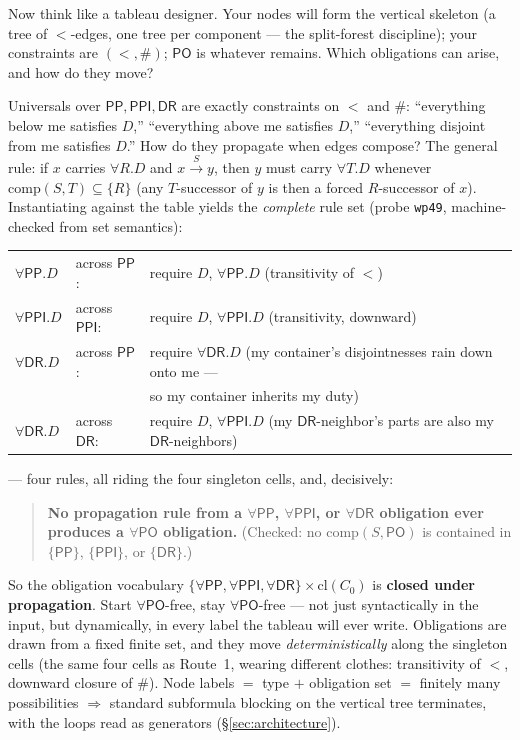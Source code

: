 \documentclass[11pt]{article}
\newcommand{\DR}{\ensuremath{\mathsf{DR}}}
\newcommand{\PO}{\ensuremath{\mathsf{PO}}}
\newcommand{\PP}{\ensuremath{\mathsf{PP}}}
\newcommand{\PPI}{\ensuremath{\mathsf{PPI}}}
\newcommand{\Comp}{\mathrm{comp}}
\newcommand{\cl}{\mathrm{cl}}
\newcommand{\code}[1]{\texttt{#1}}
\begin{document}
Now think like a tableau designer. Your nodes will form the vertical
skeleton (a tree of ${<}$-edges, one tree per component --- the
split-forest discipline); your constraints are $({<},{\#})$; $\PO$ is
whatever remains. Which obligations can arise, and how do they move?

Universals over $\PP,\PPI,\DR$ are exactly constraints on ${<}$ and
${\#}$: ``everything below me satisfies $D$,'' ``everything above me
satisfies $D$,'' ``everything disjoint from me satisfies $D$.'' How do
they propagate when edges compose? The general rule: if $x$ carries
$\forall R.D$ and $x\xrightarrow{\,S\,}y$, then $y$ must carry
$\forall T.D$ whenever $\Comp(S,T)\subseteq\{R\}$ (any $T$-successor of
$y$ is then a forced $R$-successor of $x$). Instantiating against the
table yields the \emph{complete} rule set (probe \code{wp49},
machine-checked from set semantics):

\begin{center}
\begin{tabular}{@{}lll@{}}
$\forall\PP.D$  & across $\PP$:  & require $D$, $\forall\PP.D$
  \quad(transitivity of ${<}$)\\
$\forall\PPI.D$ & across $\PPI$: & require $D$, $\forall\PPI.D$
  \quad(transitivity, downward)\\
$\forall\DR.D$  & across $\PP$:  & require $\forall\DR.D$
  \quad(my container's disjointnesses rain down onto me ---\\
  & & \phantom{require }so my container inherits my duty)\\
$\forall\DR.D$  & across $\DR$:  & require $D$, $\forall\PPI.D$
  \quad(my $\DR$-neighbor's parts are also my $\DR$-neighbors)
\end{tabular}
\end{center}

--- four rules, all riding the four singleton cells, and, decisively:

\begin{quote}
\textbf{No propagation rule from a $\forall\PP$, $\forall\PPI$, or
$\forall\DR$ obligation ever produces a $\forall\PO$ obligation.}
(Checked: no $\Comp(S,\PO)$ is contained in $\{\PP\}$, $\{\PPI\}$, or
$\{\DR\}$.)
\end{quote}

So the obligation vocabulary
$\{\forall\PP,\forall\PPI,\forall\DR\}\times\cl(C_0)$ is \textbf{closed
under propagation}. Start $\forall\PO$-free, stay $\forall\PO$-free ---
not just syntactically in the input, but dynamically, in every label
the tableau will ever write. Obligations are drawn from a fixed finite
set, and they move \emph{deterministically} along the singleton cells
(the same four cells as Route~1, wearing different clothes:
transitivity of ${<}$, downward closure of ${\#}$). Node labels $=$
type $+$ obligation set $=$ finitely many possibilities
$\Rightarrow$ standard subformula blocking on the vertical tree
terminates, with the loops read as generators
(\S\ref{sec:architecture}).
\end{document}
